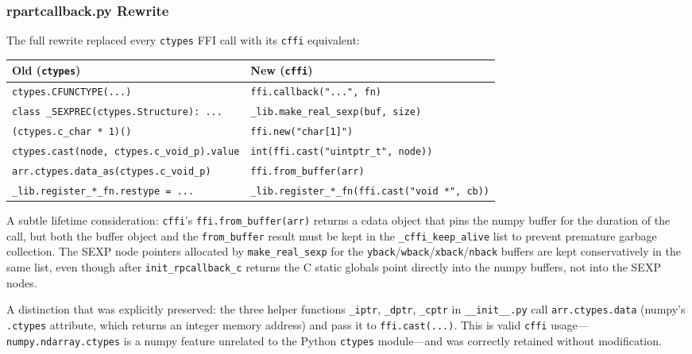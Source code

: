 \documentclass[12pt]{article}
\begin{document}
\subsubsection{rpartcallback.py Rewrite}

The full rewrite replaced every \texttt{ctypes} FFI call with its \texttt{cffi} equivalent:
\begin{center}
\begin{tabular}{ll}
\toprule
Old (\texttt{ctypes}) & New (\texttt{cffi}) \\
\midrule
\texttt{ctypes.CFUNCTYPE(...)} & \texttt{ffi.callback("...", fn)} \\
\texttt{class \_SEXPREC(ctypes.Structure): ...} & \texttt{\_lib.make\_real\_sexp(buf, size)} \\
\texttt{(ctypes.c\_char * 1)()} & \texttt{ffi.new("char[1]")} \\
\texttt{ctypes.cast(node, ctypes.c\_void\_p).value} & \texttt{int(ffi.cast("uintptr\_t", node))} \\
\texttt{arr.ctypes.data\_as(ctypes.c\_void\_p)} & \texttt{ffi.from\_buffer(arr)} \\
\texttt{\_lib.register\_*\_fn.restype = ...} & \texttt{\_lib.register\_*\_fn(ffi.cast("void *", cb))} \\
\bottomrule
\end{tabular}
\end{center}

A subtle lifetime consideration: \texttt{cffi}'s \texttt{ffi.from\_buffer(arr)} returns a cdata object that pins the numpy buffer for the duration of the call, but both the buffer object and the \texttt{from\_buffer} result must be kept in the \texttt{\_cffi\_keep\_alive} list to prevent premature garbage collection. The SEXP node pointers allocated by \texttt{make\_real\_sexp} for the \texttt{yback}/\texttt{wback}/\texttt{xback}/\texttt{nback} buffers are kept conservatively in the same list, even though after \texttt{init\_rpcallback\_c} returns the C static globals point directly into the numpy buffers, not into the SEXP nodes.

A distinction that was explicitly preserved: the three helper functions \texttt{\_iptr}, \texttt{\_dptr}, \texttt{\_cptr} in \texttt{\_\_init\_\_.py} call \texttt{arr.ctypes.data} (numpy's \texttt{.ctypes} attribute, which returns an integer memory address) and pass it to \texttt{ffi.cast(...)}. This is valid \texttt{cffi} usage---\texttt{numpy.ndarray.ctypes} is a numpy feature unrelated to the Python \texttt{ctypes} module---and was correctly retained without modification.
\end{document}
